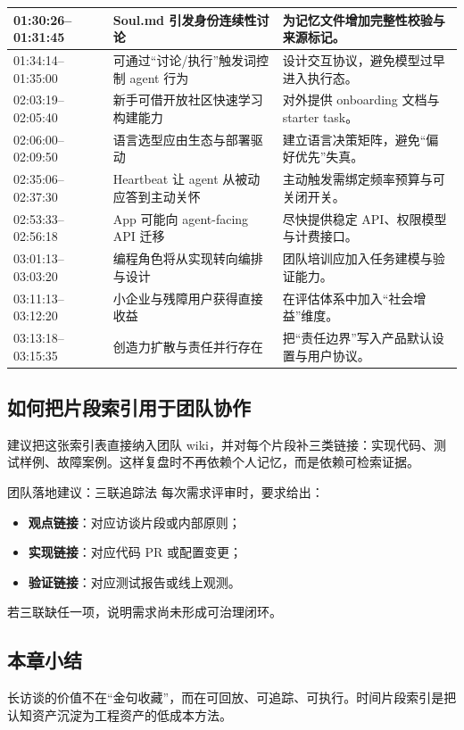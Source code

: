 \begin{longtable}{p{}p{}p{}}
\midrule
01:30:26--01:31:45 & Soul.md 引发身份连续性讨论 & 为记忆文件增加完整性校验与来源标记。 \\
\midrule
01:34:14--01:35:00 & 可通过“讨论/执行”触发词控制 agent 行为 & 设计交互协议，避免模型过早进入执行态。 \\
\midrule
02:03:19--02:05:40 & 新手可借开放社区快速学习构建能力 & 对外提供 onboarding 文档与 starter task。 \\
\midrule
02:06:00--02:09:50 & 语言选型应由生态与部署驱动 & 建立语言决策矩阵，避免“偏好优先”失真。 \\
\midrule
02:35:06--02:37:30 & Heartbeat 让 agent 从被动应答到主动关怀 & 主动触发需绑定频率预算与可关闭开关。 \\
\midrule
02:53:33--02:56:18 & App 可能向 agent-facing API 迁移 & 尽快提供稳定 API、权限模型与计费接口。 \\
\midrule
03:01:13--03:03:20 & 编程角色将从实现转向编排与设计 & 团队培训应加入任务建模与验证能力。 \\
\midrule
03:11:13--03:12:20 & 小企业与残障用户获得直接收益 & 在评估体系中加入“社会增益”维度。 \\
\midrule
03:13:18--03:15:35 & 创造力扩散与责任并行存在 & 把“责任边界”写入产品默认设置与用户协议。 \\
\bottomrule
\end{longtable}

\subsection{如何把片段索引用于团队协作}

建议把这张索引表直接纳入团队 wiki，并对每个片段补三类链接：实现代码、测试样例、故障案例。这样复盘时不再依赖个人记忆，而是依赖可检索证据。

\begin{importantbox}{团队落地建议：三联追踪法}
每次需求评审时，要求给出：
\begin{itemize}
    \item \textbf{观点链接}：对应访谈片段或内部原则；
    \item \textbf{实现链接}：对应代码 PR 或配置变更；
    \item \textbf{验证链接}：对应测试报告或线上观测。
\end{itemize}
若三联缺任一项，说明需求尚未形成可治理闭环。
\end{importantbox}

\subsection{本章小结}
长访谈的价值不在“金句收藏”，而在可回放、可追踪、可执行。时间片段索引是把认知资产沉淀为工程资产的低成本方法。

